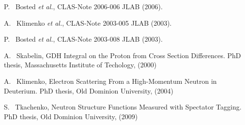  P. ~Bosted {\em et al.}, CLAS-Note 2006-006 JLAB (2006). %

 A. ~Klimenko {\em et al.}, CLAS-Note 2003-005 JLAB (2003).

 P. ~Bosted {\em et al.}, CLAS-Note 2003-008 JLAB (2003).



 A. ~Skabelin, GDH Integral on the Proton from Cross Section Differences. PhD thesis, Massachusetts Institute of Techology, (2000) %

 A. ~Klimenko, Electron Scattering From a High-Momentum Neutron in Deuterium. PhD thesis, Old Dominion University, (2004)

 S. ~Tkachenko, Neutron Structure Functions Measured with Spectator Tagging. PhD thesis, Old Dominion University, (2009)


